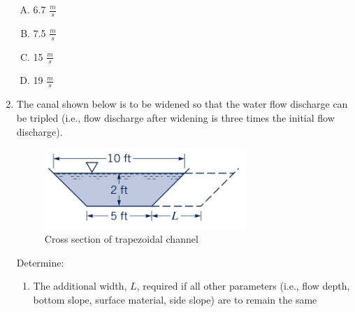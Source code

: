 \documentclass[12pt]{article}
\begin{document}
\begin{enumerate}
\begin{enumerate}[A)]
\item 6.7 $\frac{m}{s}$
\item 7.5 $\frac{m}{s}$
\item 15 $\frac{m}{s}$
\item 19 $\frac{m}{s}$
\end{enumerate}

\clearpage

\item 
The canal shown below is to be widened so that the water flow discharge can be tripled (i.e., flow discharge after widening is three times the initial flow discharge). 

\begin{figure}[htbp] %
   \centering
   \includegraphics[width=3in]{trapezoid.png} 
   \caption{Cross section of trapezoidal channel}
   \label{fig:continunity}
\end{figure}

Determine:
\begin{enumerate}
\item The additional width, $L$, required if all other parameters (i.e., flow depth, bottom slope, surface material, side slope) are to remain the same
\end{enumerate}

\clearpage


\end{enumerate}
\end{document}
